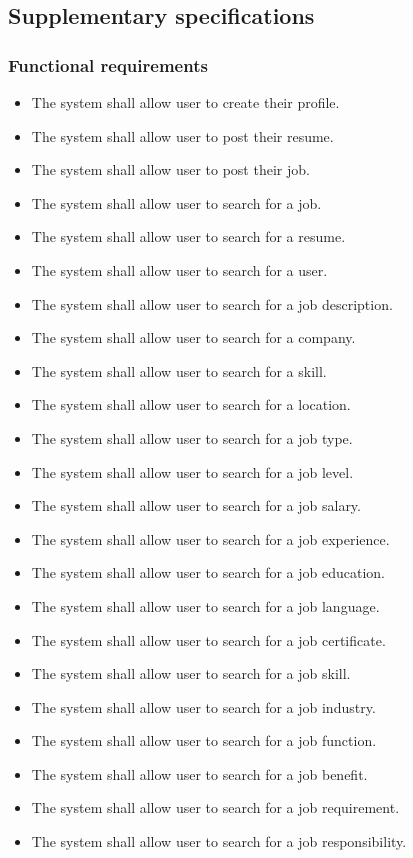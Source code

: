 \documentclass[a4paper]{article}
\begin{document}
\subsection{Supplementary specifications}
\subsubsection{Functional requirements}
\begin{itemize}
    \item The system shall allow user to create their profile.
    \item The system shall allow user to post their resume.
    \item The system shall allow user to post their job.
    \item The system shall allow user to search for a job.
    \item The system shall allow user to search for a resume.
    \item The system shall allow user to search for a user.
    \item The system shall allow user to search for a job description.
    \item The system shall allow user to search for a company.
    \item The system shall allow user to search for a skill.
    \item The system shall allow user to search for a location.
    \item The system shall allow user to search for a job type.
    \item The system shall allow user to search for a job level.
    \item The system shall allow user to search for a job salary.
    \item The system shall allow user to search for a job experience.
    \item The system shall allow user to search for a job education.
    \item The system shall allow user to search for a job language.
    \item The system shall allow user to search for a job certificate.
    \item The system shall allow user to search for a job skill.
    \item The system shall allow user to search for a job industry.
    \item The system shall allow user to search for a job function.
    \item The system shall allow user to search for a job benefit.
    \item The system shall allow user to search for a job requirement.
    \item The system shall allow user to search for a job responsibility.
\end{itemize}
\end{document}
